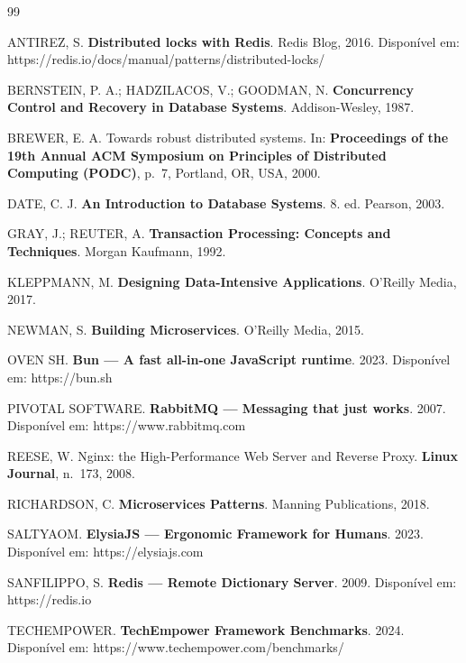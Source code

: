 \documentclass[12pt]{article}
\begin{document}
\begin{thebibliography}{99}

ANTIREZ, S. \textbf{Distributed locks with Redis}. Redis Blog, 2016.
Disponível em: https://redis.io/docs/manual/patterns/distributed-locks/

BERNSTEIN, P. A.; HADZILACOS, V.; GOODMAN, N. \textbf{Concurrency Control and
Recovery in Database Systems}. Addison-Wesley, 1987.

BREWER, E. A. Towards robust distributed systems. In: \textbf{Proceedings of the
19th Annual ACM Symposium on Principles of Distributed Computing (PODC)}, p.~7,
Portland, OR, USA, 2000.

DATE, C. J. \textbf{An Introduction to Database Systems}. 8. ed. Pearson, 2003.

GRAY, J.; REUTER, A. \textbf{Transaction Processing: Concepts and Techniques}.
Morgan Kaufmann, 1992.

KLEPPMANN, M. \textbf{Designing Data-Intensive Applications}. O'Reilly Media, 2017.

NEWMAN, S. \textbf{Building Microservices}. O'Reilly Media, 2015.

OVEN SH. \textbf{Bun — A fast all-in-one JavaScript runtime}. 2023.
Disponível em: https://bun.sh

PIVOTAL SOFTWARE. \textbf{RabbitMQ — Messaging that just works}. 2007.
Disponível em: https://www.rabbitmq.com

REESE, W. Nginx: the High-Performance Web Server and Reverse Proxy.
\textbf{Linux Journal}, n.~173, 2008.

RICHARDSON, C. \textbf{Microservices Patterns}. Manning Publications, 2018.

SALTYAOM. \textbf{ElysiaJS — Ergonomic Framework for Humans}. 2023.
Disponível em: https://elysiajs.com

SANFILIPPO, S. \textbf{Redis — Remote Dictionary Server}. 2009.
Disponível em: https://redis.io

TECHEMPOWER. \textbf{TechEmpower Framework Benchmarks}. 2024.
Disponível em: https://www.techempower.com/benchmarks/

\end{thebibliography}
\end{document}
